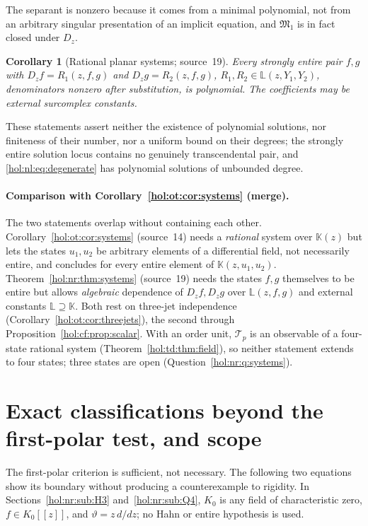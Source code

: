 \documentclass[11pt]{article}
\numberwithin{equation}{section}
\newtheorem{corollary}[theorem]{Corollary}
\theoremstyle{definition}
\theoremstyle{remark}
\newcommand{\KK}{\mathbb K}
\begin{document}
The separant is nonzero because it comes from a minimal polynomial, not from
an arbitrary singular presentation of an implicit equation, and
$\mathfrak M_1$ is in fact closed under $D_z$.

\begin{corollary}[Rational planar systems; source~19]
\label{hol:nr:cor:planar}
Every strongly entire pair $f,g$ with $D_zf=R_1(z,f,g)$ and $D_zg=R_2(z,f,g)$,
$R_1,R_2\in\mathbb L(z,Y_1,Y_2)$, denominators nonzero after substitution, is
polynomial. The coefficients may be external surcomplex constants.
\end{corollary}

These statements assert neither the existence of polynomial solutions, nor
finiteness of their number, nor a uniform bound on their degrees; the
strongly entire solution locus contains no genuinely transcendental pair, and
\eqref{hol:nl:eq:degenerate} has polynomial solutions of unbounded degree.

\paragraph{Comparison with Corollary~\ref{hol:ot:cor:systems} (merge).}
The two statements overlap without containing each other.
Corollary~\ref{hol:ot:cor:systems} (source~14) needs a \emph{rational} system
over $\KK(z)$ but lets the states $u_1,u_2$ be arbitrary elements of a
differential field, not necessarily entire, and concludes for every entire
element of $\KK(z,u_1,u_2)$. Theorem~\ref{hol:nr:thm:systems} (source~19) needs
the states $f,g$ themselves to be entire but allows \emph{algebraic}
dependence of $D_zf,D_zg$ over $\mathbb L(z,f,g)$ and external constants
$\mathbb L\supseteq\KK$. Both rest on three-jet independence
(Corollary~\ref{hol:ot:cor:threejets}), the second through
Proposition~\ref{hol:cf:prop:scalar}. With an order unit, $\mathcal T_p$ is an
observable of a four-state rational system (Theorem~\ref{hol:td:thm:field}), so
neither statement extends to four states; three states are open
(Question~\ref{hol:nr:q:systems}).

\section{Exact classifications beyond the first-polar test, and scope}
\label{hol:nr:sec:boundary}

The first-polar criterion is sufficient, not necessary. The following two
equations show its boundary without producing a counterexample to rigidity.
In Sections~\ref{hol:nr:sub:H3} and~\ref{hol:nr:sub:Q4}, $K_0$ is any field of
characteristic zero, $f\in K_0[[z]]$, and $\vartheta=z\,d/dz$; no Hahn or
entire hypothesis is used.
\end{document}
